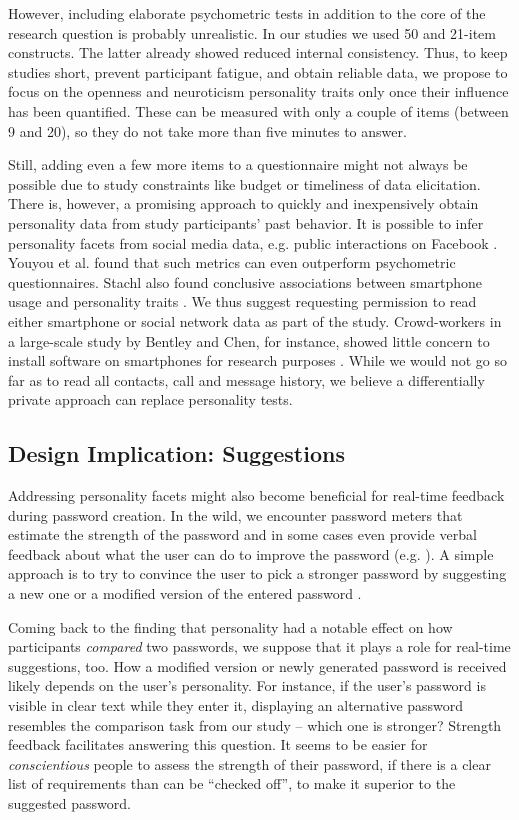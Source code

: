 However, including elaborate psychometric tests in addition to the core of the research question is probably unrealistic. In our studies we used 50 and 21-item constructs. The latter already showed reduced internal consistency. Thus, to keep studies short, prevent participant fatigue, and obtain reliable data, we propose to focus on the openness and neuroticism personality traits only once their influence has been quantified. These can be measured with only a couple of items (between 9 and 20), so they do not take more than five minutes to answer. 

Still, adding even a few more items to a questionnaire might not always be possible due to study constraints like budget or timeliness of data elicitation. There is, however, a promising approach to quickly and inexpensively obtain personality data from study participants' past behavior. It is possible to infer personality facets from social media data, e.g. public interactions on Facebook \cite{Youyou2015Personality}. Youyou et al. found that such metrics can even outperform psychometric questionnaires. Stachl \etal also found conclusive associations between smartphone usage and personality traits \cite{Stachl2017PersonalitySmartphones}. We thus suggest requesting permission to read either smartphone or social network data as part of the study. Crowd-workers in a large-scale study by Bentley and Chen, for instance, showed little concern to install software on smartphones for research purposes \cite{Bentley2015Phonebook}. While we would not go so far as to read all contacts, call and message history, we believe a differentially private approach can replace personality tests. 

\subsection{Design Implication: Suggestions}
Addressing personality facets might also become beneficial for real-time feedback during password creation. In the wild, we encounter password meters that estimate the strength of the password and in some cases even provide verbal feedback about what the user can do to improve the password (e.g. \cite{Wheeler2016zxcvbn}). A simple approach is to try to convince the user to pick a stronger password by suggesting a new one or a modified version of the entered password \cite{Forget2008ImprovingPasswordsThroughPersuasion, Seitz2016SuggestionsDecoy, Shay2015SpoonfulOfSugar}. 

Coming back to the finding that personality had a notable effect on how participants \textit{compared} two passwords, we suppose that it plays a role for real-time suggestions, too. How a modified version or newly generated password is received likely depends on the user's personality. For instance, if the user's password is visible in clear text while they enter it, displaying an alternative password resembles the comparison task from our study -- which one is stronger? Strength feedback facilitates answering this question. It seems to be easier for \textit{conscientious} people to assess the strength of their password, if there is a clear list of requirements than can be ``checked off'', to make it superior to the suggested password. 

